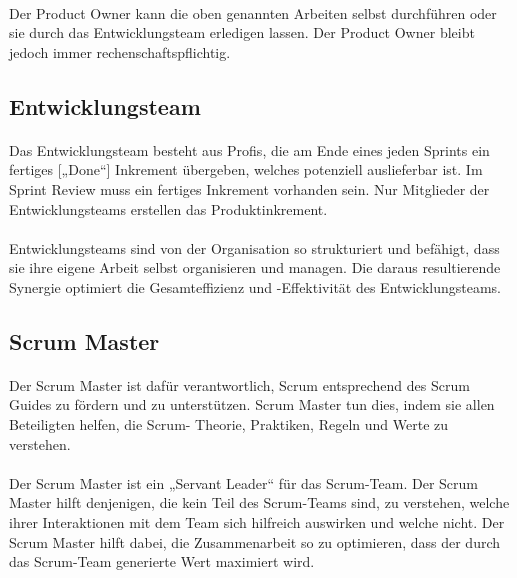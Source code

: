 \documentclass{article}
\begin{document}
\paragraph{}
Der Product Owner kann die oben genannten Arbeiten selbst durchführen oder sie durch das Entwicklungsteam erledigen lassen. Der Product Owner bleibt jedoch immer rechenschaftspflichtig.
\cite[S.~6]{scrum}

\subsection{Entwicklungsteam}
\paragraph{}
Das Entwicklungsteam besteht aus Profis, die am Ende eines jeden Sprints ein fertiges [„Done“] Inkrement übergeben, welches potenziell auslieferbar ist. Im Sprint Review muss ein fertiges Inkrement vorhanden sein. Nur Mitglieder der Entwicklungsteams erstellen das Produktinkrement.

\paragraph{}
Entwicklungsteams sind von der Organisation so strukturiert und befähigt, dass sie ihre eigene Arbeit selbst organisieren und managen. Die daraus resultierende Synergie optimiert die Gesamteffizienz und -Effektivität des Entwicklungsteams.
\cite[S.~7]{scrum}

\subsection{Scrum Master}
\paragraph{}
Der Scrum Master ist dafür verantwortlich, Scrum entsprechend des Scrum Guides zu fördern und zu unterstützen. Scrum Master tun dies, indem sie allen Beteiligten helfen, die Scrum- Theorie, Praktiken, Regeln und Werte zu verstehen.

\paragraph{}
Der Scrum Master ist ein „Servant Leader“ für das Scrum-Team. Der Scrum Master hilft denjenigen, die kein Teil des Scrum-Teams sind, zu verstehen, welche ihrer Interaktionen mit dem Team sich hilfreich auswirken und welche nicht. Der Scrum Master hilft dabei, die Zusammenarbeit so zu optimieren, dass der durch das Scrum-Team generierte Wert maximiert wird.
\cite[S.~8]{scrum}
\end{document}
